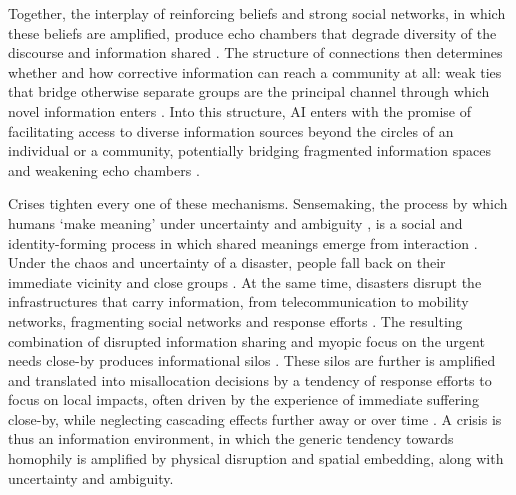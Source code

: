 \documentclass[pdflatex,sn-basic]{sn-jnl}
\begin{document}
Together, the interplay of reinforcing beliefs and strong social networks, in which these beliefs are amplified, produce echo chambers that degrade diversity of the discourse and information shared \citep{Gillani2018}. The structure of connections then determines whether and how corrective information can reach a community at all: weak ties that bridge otherwise separate groups are the principal
channel through which novel information enters
\citep{granovetter1973strength}. Into this structure, AI enters with the promise of facilitating access to diverse information sources beyond the circles of an individual or a community, potentially bridging fragmented information spaces and weakening echo chambers \citep{jeon2024hearhere}. 
 
Crises tighten every one of these mechanisms. Sensemaking, the process by which humans `make meaning' under uncertainty and ambiguity
\citep{weick2005organizing}, is a social and identity-forming process in which shared meanings emerge from interaction \citep{maitlis2010sensemaking,klein2010rapid, comes2026sensemaking}. Under the chaos and uncertainty of a disaster, people fall back on their immediate vicinity and close groups \citep{comes2020coordination}. At the same time, disasters disrupt the infrastructures that carry information, from telecommunication to mobility networks, fragmenting social networks and response efforts \citep{holguinveras2012unique}. The resulting combination of disrupted information sharing and myopic focus on the urgent needs close-by produces informational silos \citep{pan2012crisis}. These silos are further is amplified and translated into misallocation decisions by a tendency of response efforts to focus on local impacts, often driven
by the experience of immediate suffering close-by, while neglecting cascading effects further away or over time
\citep{sigala2022mitigating,wolbers2018introducing}. A crisis is thus an information environment, in which the generic tendency towards homophily is amplified by physical disruption and spatial embedding, along with uncertainty and ambiguity.
 
\end{document}
